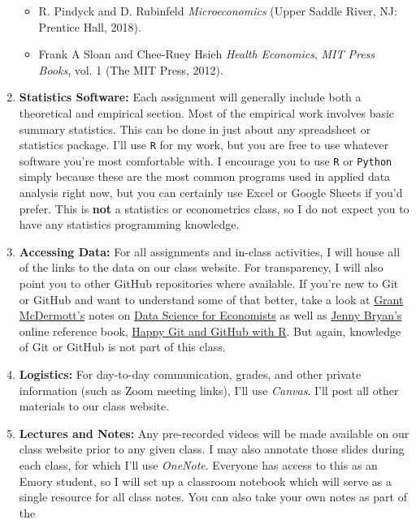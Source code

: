 \documentclass[11pt,]{article}
\providecommand{\tightlist}{%
  \setlength{\itemsep}{0pt}\setlength{\parskip}{0pt}}
\begin{document}
\begin{enumerate}
  \begin{itemize}
  \tightlist
  \item
    R. Pindyck and D. Rubinfeld \emph{Microeconomics} (Upper Saddle
    River, NJ: Prentice Hall, 2018).
  \item
    Frank A Sloan and Chee-Ruey Hsieh \emph{Health Economics}, \emph{MIT
    Press Books}, vol. 1 (The MIT Press, 2012).
  \end{itemize}
\item
  \textbf{Statistics Software:} Each assignment will generally include
  both a theoretical and empirical section. Most of the empirical work
  involves basic summary statistics. This can be done in just about any
  spreadsheet or statistics package. I'll use \texttt{R} for my work,
  but you are free to use whatever software you're most comfortable
  with. I encourage you to use \texttt{R} or \texttt{Python} simply
  because these are the most common programs used in applied data
  analysis right now, but you can certainly use Excel or Google Sheets
  if you'd prefer. This is \textbf{not} a statistics or econometrics
  class, so I do not expect you to have any statistics programming
  knowledge.
\item
  \textbf{Accessing Data:} For all assignments and in-class activities,
  I will house all of the links to the data on our class website. For
  transparency, I will also point you to other GitHub repositories where
  available. If you're new to Git or GitHub and want to understand some
  of that better, take a look at
  \href{https://grantmcdermott.com/}{Grant McDermott's} notes on
  \href{https://github.com/uo-ec607/lectures}{Data Science for
  Economists} as well as \href{https://jennybryan.org/}{Jenny Bryan's}
  online reference book, \href{https://happygitwithr.com/}{Happy Git and
  GitHub with R}. But again, knowledge of Git or GitHub is not part of
  this class.
\item
  \textbf{Logistics:} For day-to-day communication, grades, and other
  private information (such as Zoom meeting links), I'll use
  \emph{Canvas}. I'll post all other materials to our class website.
\item
  \textbf{Lectures and Notes:} Any pre-recorded videos will be made
  available on our class website prior to any given class. I may also
  annotate those slides during each class, for which I'll use
  \emph{OneNote}. Everyone has access to this as an Emory student, so I
  will set up a classroom notebook which will serve as a single resource
  for all class notes. You can also take your own notes as part of the

\end{enumerate}
\end{document}
